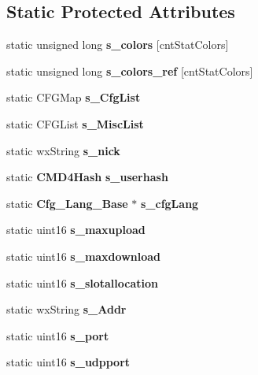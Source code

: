 \subsection*{Static Protected Attributes}
\begin{DoxyCompactItemize}
\item 
static unsigned long {\bf s\_\-colors} [cntStatColors]\label{classCPreferences_af9b3d81500147056a68f74fd1c8c4f6a}

\item 
static unsigned long {\bf s\_\-colors\_\-ref} [cntStatColors]\label{classCPreferences_a268c99d2c7d46d3bc0a21db3658dc193}

\item 
static CFGMap {\bfseries s\_\-CfgList}\label{classCPreferences_a67200e67b1eaade10f9bb290adcdda75}

\item 
static CFGList {\bfseries s\_\-MiscList}\label{classCPreferences_a1163eed6de88611e16cca62ff2fb8ecc}

\item 
static wxString {\bfseries s\_\-nick}\label{classCPreferences_ae786939dbeb3e41d053ef98c4004c770}

\item 
static {\bf CMD4Hash} {\bfseries s\_\-userhash}\label{classCPreferences_aebdadb353b68fb9ff5fe175c6b271002}

\item 
static {\bf Cfg\_\-Lang\_\-Base} $\ast$ {\bfseries s\_\-cfgLang}\label{classCPreferences_a2bed85bd3f1050ed73200175f3296ddd}

\item 
static uint16 {\bfseries s\_\-maxupload}\label{classCPreferences_a448585f6599ce04352fe5d4e30333a86}

\item 
static uint16 {\bfseries s\_\-maxdownload}\label{classCPreferences_ac970014228fd2bfe2e8f3974e62baa37}

\item 
static uint16 {\bfseries s\_\-slotallocation}\label{classCPreferences_a68f05f1e66230b78d758acc682a0665e}

\item 
static wxString {\bfseries s\_\-Addr}\label{classCPreferences_ad61bc7e2a7452def870dd05b9f178c86}

\item 
static uint16 {\bfseries s\_\-port}\label{classCPreferences_ad0a192cd1f32e16f2ade7c5589ae9368}

\item 
static uint16 {\bfseries s\_\-udpport}\label{classCPreferences_af3926906b7a79a5d47537a09ccbd2f29}


\end{DoxyCompactItemize}
